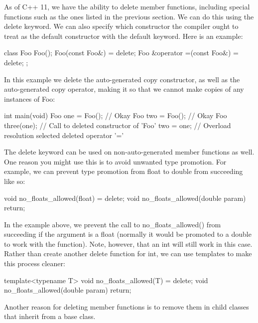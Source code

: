 \documentclass{article}
\begin{document}
As of C++ 11, we have the ability to delete member functions, including special functions such as the ones
listed in the previous section. We can do this using the delete keyword. We can also specify which
constructor the compiler ought to treat as the default constructor with the default keyword. Here is an
example:

\begin{cpplst}

class Foo
{
    Foo();
    Foo(const Foo&) = delete;
    Foo &operator =(const Foo&) = delete;
};

\end{cpplst}

In this example we delete the auto-generated copy constructor, as well as the auto-generated copy operator,
making it so that we cannot make copies of any instances of Foo:

\begin{cpplst}
int main(void)
{
    Foo one = Foo();    // Okay
    Foo two = Foo();    // Okay
    Foo three(one);     // Call to deleted constructor of 'Foo'
    two = one;          // Overload resolution selected deleted operator '='
}
\end{cpplst}

The delete keyword can be used on non-auto-generated member functions as well. One reason you might use this
is to avoid unwanted type promotion. For example, we can prevent type promotion from float to double from
succeeding like so:

\begin{cpplst}

void no_floats_allowed(float) = delete;
void no_floats_allowed(double param) { return; }

\end{cpplst}

In the example above, we prevent the call to no\_floats\_allowed() from succeeding if the argument is a
float (normally it would be promoted to a double to work with the function). Note, however, that an int will
still work in this case. Rather than create another delete function for int, we can use templates to make
this process cleaner:

\begin{cpplst}

template<typename T>
void no_floats_allowed(T) = delete;
void no_floats_allowed(double param) { return; }

\end{cpplst}

Another reason for deleting member functions is to remove them in child classes that inherit from a base
class.
\end{document}

